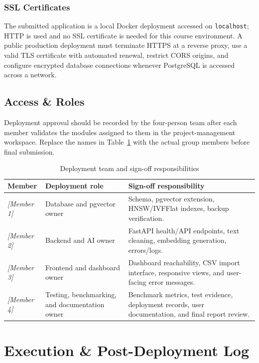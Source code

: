 \documentclass[conference]{IEEEtran}
\begin{document}
\subsubsection{SSL Certificates}
The submitted application is a local Docker deployment accessed on \texttt{localhost}; HTTP is used and no SSL certificate is needed for this course environment. A public production deployment must terminate HTTPS at a reverse proxy, use a valid TLS certificate with automated renewal, restrict CORS origins, and configure encrypted database connections whenever PostgreSQL is accessed across a network.

\subsection{Access \& Roles}
Deployment approval should be recorded by the four-person team after each member validates the modules assigned to them in the project-management workspace. Replace the names in Table~\ref{tab:roles} with the actual group members before final submission.

\begin{table}[!t]
\caption{Deployment team and sign-off responsibilities}
\label{tab:roles}
\centering
\begin{tabular}{p{}p{}p{}}
\toprule
\textbf{Member} & \textbf{Deployment role} & \textbf{Sign-off responsibility}\\
\midrule
\textit{[Member 1]} & Database and pgvector owner & Schema, pgvector extension, HNSW/IVFFlat indexes, backup verification.\\
\textit{[Member 2]} & Backend and AI owner & FastAPI health/API endpoints, text cleaning, embedding generation, errors/logs.\\
\textit{[Member 3]} & Frontend and dashboard owner & Dashboard reachability, CSV import interface, responsive views, and user-facing error messages.\\
\textit{[Member 4]} & Testing, benchmarking, and documentation owner & Benchmark metrics, test evidence, deployment records, user documentation, and final report review.\\
\bottomrule
\end{tabular}
\end{table}

\section{Execution \& Post-Deployment Log}
\end{document}
